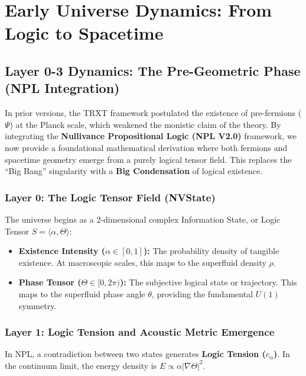 \documentclass[a4paper,12pt]{article}
\begin{document}
\section{Early Universe Dynamics: From Logic to Spacetime}

\subsection{Layer 0-3 Dynamics: The Pre-Geometric Phase (NPL Integration)}

In prior versions, the TRXT framework postulated the existence of pre-fermions ($\Psi$) at the Planck scale, which weakened the monistic claim of the theory. By integrating the \textbf{Nullivance Propositional Logic (NPL V2.0)} framework, we now provide a foundational mathematical derivation where both fermions and spacetime geometry emerge from a purely logical tensor field. This replaces the ``Big Bang'' singularity with a \textbf{Big Condensation} of logical existence.

\subsubsection{Layer 0: The Logic Tensor Field (NVState)}
The universe begins as a 2-dimensional complex Information State, or Logic Tensor $S = \langle \alpha, \Theta \rangle$:
\begin{itemize}
    \item \textbf{Existence Intensity ($\alpha \in [0, 1]$):} The probability density of tangible existence. At macroscopic scales, this maps to the superfluid density $\rho$.
    \item \textbf{Phase Tensor ($\Theta \in [0, 2\pi)$):} The subjective logical state or trajectory. This maps to the superfluid phase angle $\theta$, providing the fundamental $U(1)$ symmetry. 
\end{itemize}

\subsubsection{Layer 1: Logic Tension and Acoustic Metric Emergence}
In NPL, a contradiction between two states generates \textbf{Logic Tension ($c_\alpha$)}. In the continuum limit, the energy density is $E \propto \alpha |\nabla \Theta|^2$. 
\end{document}
